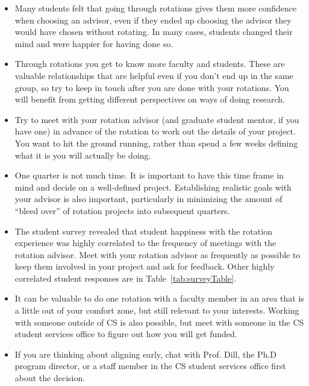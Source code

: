 \documentclass[10pt]{book}
\begin{document}
\begin{itemize}

\item Many students felt that going through rotations gives them more confidence when choosing an advisor, even if they ended up choosing the advisor they would have chosen without rotating. In many cases, students changed their mind and were happier for having done so.

\item Through rotations you get to know more faculty and students. These are valuable relationships that are helpful even if you don't end up in the same group, so try to keep in touch after you are done with your rotations. You will benefit from getting different perspectives on ways of doing research.

\item Try to meet with your rotation advisor (and graduate student mentor, if you have one) in advance of the rotation to work out the details of your project. You want to hit the ground running, rather than spend a few weeks defining what it is you will actually be doing.

\item One quarter is not much time. It is important to have this time frame in mind and decide on a well-defined project. Establishing realistic goals with your advisor is also important, particularly in minimizing the amount of ``bleed over'' of rotation projects into subsequent quarters. 

\item The student survey revealed that student happiness with the rotation experience was highly correlated to the frequency of meetings with the rotation advisor. Meet with your rotation advisor as frequently as possible to keep them involved in your project and ask for feedback. Other highly correlated student responses are in Table~\ref{tab:surveyTable}.



\item It can be valuable to do one rotation with a faculty member in an area that is a little out of your comfort zone, but still relevant to your interests. Working with someone outside of CS is also possible, but meet with someone in the CS student services office to figure out how you will get funded.

\item If you are thinking about aligning early, chat with Prof. Dill, the Ph.D program director, or a staff member in the CS student services office first about the decision.

\end{itemize}
\end{document}
